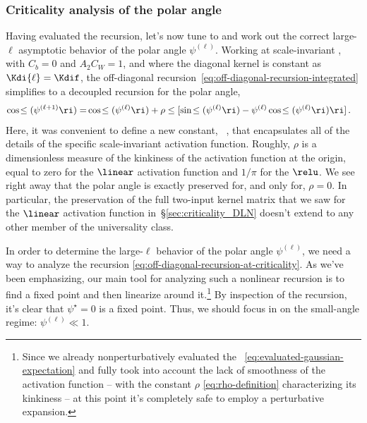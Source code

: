 \subsubsection{Criticality analysis of the polar angle}
Having evaluated the recursion, let's now tune to  and work out the correct large-$\ell$ asymptotic behavior of the polar angle $\psi^{(\ell)}$. Working at scale-invariant , with $C_b=0$ and $A_2 C_W=1$, and where the diagonal kernel is constant as $\Kdi{\ell} =\Kdif$,
the off-diagonal recursion~\eqref{eq:off-diagonal-recursion-integrated} simplifies to a decoupled recursion for the polar angle,
\begin{align}\label{eq:off-diagonal-recursion-at-criticality}
\cos\!\le(\psi^{(\ell+1)}\ri)=&\cos\!\le(\psi^{(\ell)}\ri)+\rho\le[\sin\!\le(\psi^{(\ell)}\ri)-\psi^{(\ell)}\cos\!\le(\psi^{(\ell)}\ri)\ri]\, .
\end{align}
Here, it was convenient to define a new constant,
\be\label{eq:rho-definition}
\rho\equiv {} \, ,
\ee
that encapsulates all of the details of the specific scale-invariant activation function. Roughly, $\rho$ is a dimensionless measure of the kinkiness of the activation function at the origin, equal to zero for the $\linear$ activation function and $1/\pi$ for the $\relu$. We see right away that the polar angle is exactly preserved for, and only for, $\rho =0$.
In particular, the preservation of the full two-input kernel matrix that we saw for the $\linear$ activation function in~\S\ref{sec:criticality_DLN} doesn't extend to any other
member of the universality class.



In order to determine the large-$\ell$ behavior of the polar angle $\psi^{(\ell)}$, we need a way to analyze the recursion \eqref{eq:off-diagonal-recursion-at-criticality}. As we've been emphasizing, our main tool for analyzing such a nonlinear recursion is to find a fixed point and then linearize around it.\footnote{
    Since we already nonperturbatively evaluated the ~\eqref{eq:evaluated-gaussian-expectation} and fully took into account the lack of smoothness of the activation function -- with the constant $\rho$ \eqref{eq:rho-definition} characterizing its kinkiness -- at this point it's completely safe to employ a perturbative expansion.
} By inspection of the recursion, it's clear that $\psi^{\star}=0$ is a fixed point.
Thus, we should focus in on the small-angle regime:  $\psi^{(\ell)}\ll 1$.






